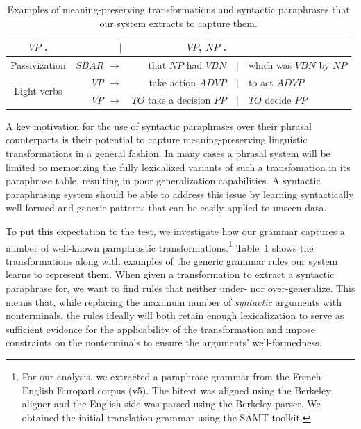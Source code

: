 \documentclass[11pt]{article}
\begin{document}
\begin{table}[!ht]
\begin{center}
\begin{tabular}{|c|rrcl|}
    $\mathit{VP}$ . & $\mid$ & $\mathit{VP}$, $\mathit{NP}$ . \\
    \hline
    \hline
    Passivization &
    $\mathit{SBAR}$ $\rightarrow$ & that $\mathit{NP}$ had
    $\mathit{VBN}$ & $\mid$ & which was $\mathit{VBN}$ by $\mathit{NP}$ \\
    \hline
    \multirow{2}{*}{Light verbs} & $\mathit{VP}$ $\rightarrow$ & take action $\mathit{ADVP}$ &
    $\mid$ & to act $\mathit{ADVP}$ \\
    & $\mathit{VP}$ $\rightarrow$ & $\mathit{TO}$ take a decision $\mathit{PP}$ &
    $\mid$ & $\mathit{TO}$ decide $\mathit{PP}$ \\
    \hline
\end{tabular}
\end{center}
\caption{Examples of meaning-preserving transformations and syntactic
  paraphrases that our system extracts to capture them.}
\label{example_rules}
\end{table}


A key motivation for the use of syntactic paraphrases over their
phrasal counterparts is their potential to capture meaning-preserving
linguistic transformations in a general fashion. In many cases a
phrasal system will be limited to memorizing the fully lexicalized
variants of such a transfomation in its paraphrase table, resulting in
poor generalization capabilities. A syntactic paraphrasing system
should be able to address this issue by learning syntactically
well-formed and generic patterns that can be easily applied to unseen
data.

To put this expectation to the test, we investigate how our grammar
captures a number of well-known paraphrastic
transformations.\footnote{For our analysis, we extracted a paraphrase grammar from the French-English Europarl corpus (v5). The bitext was aligned using the Berkeley aligner and the English side was parsed using the Berkeley parser. We obtained the initial translation grammar using the SAMT toolkit. }
Table~\ref{example_rules} shows the transformations
along with examples of the generic grammar rules our system learns to
represent them. When given a transformation to extract a syntactic
paraphrase for, we want to find rules that neither under- nor
over-generalize. This means that, while replacing the maximum number
of \emph{syntactic} arguments with nonterminals, the rules ideally
will both retain enough lexicalization to serve as sufficient evidence
for the applicability of the transformation and impose constraints on
the nonterminals to ensure the arguments' well-formedness.
\end{document}
